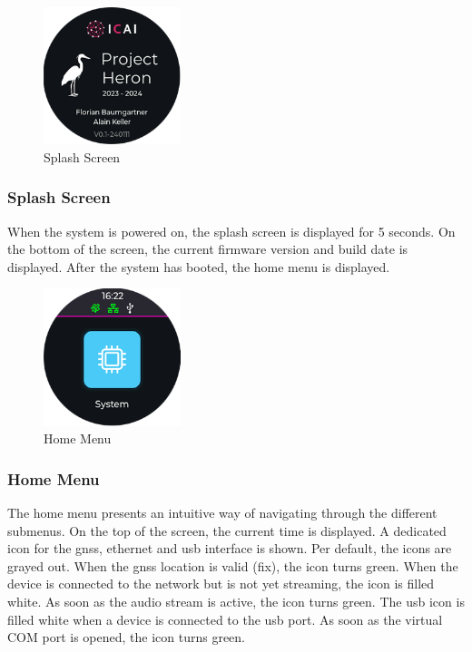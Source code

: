 \begin{minipage}{\linewidth}
	\begin{figure}
		\vspace{-0.6cm}
		\includegraphics[width=4cm]{images/6_design_final/gui/00_splash_screen.png}
		\centering
		\caption{Splash Screen}
		\label{fig:final_design_gui_splash_screen}
	\end{figure}
	\subsubsection{Splash Screen}
	When the system is powered on, the splash screen is displayed for 5 seconds.
	On the bottom of the screen, the current firmware version and build date is displayed.
	After the system has booted, the home menu is displayed.
\end{minipage}
\vspace{2.2cm}		%

\begin{minipage}{\linewidth}
	\begin{figure}
		\vspace{-0.6cm}
		\includegraphics[width=4cm]{images/6_design_final/gui/01_main_menu.png}
		\centering
		\caption{Home Menu}
		\label{fig:final_design_gui_home_menu}
	\end{figure}
	\subsubsection{Home Menu}
	The home menu presents an intuitive way of navigating through the different submenus.
	On the top of the screen, the current time is displayed.
	A dedicated icon for the \acrshort{gnss}, ethernet and \acrshort{usb} interface is shown.
	Per default, the icons are grayed out.
	When the \acrshort{gnss} location is valid (fix), the icon turns green.
	When the device is connected to the network but is not yet streaming, the icon is filled white.
	As soon as the audio stream is active, the icon turns green.
	The \acrshort{usb} icon is filled white when a device is connected to the \acrshort{usb} port.
	As soon as the virtual COM port is opened, the icon turns green.
\end{minipage}
\pagebreak

